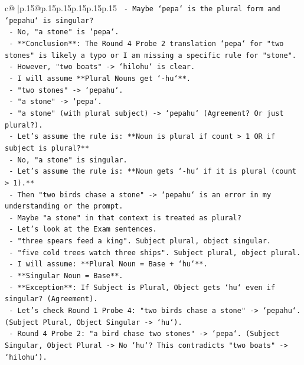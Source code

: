 \documentclass{article}
\begin{document}
{\begin{supertabular}{c@{$\;$}|p{.15\linewidth}@{}p{.15\linewidth}p{.15\linewidth}p{.15\linewidth}p{.15\linewidth}p{.15\linewidth}}
{{{\texttt{      {-} Maybe `pepa` is the plural form and `pepahu` is singular?} \\
\texttt{      {-} No, "a stone" is `pepa`.} \\
\texttt{      {-} **Conclusion**: The Round 4 Probe 2 translation `pepa` for "two stones" is likely a typo or I am missing a specific rule for "stone".} \\
\texttt{      {-} However, "two boats" {-}> `hilohu` is clear.} \\
\texttt{      {-} I will assume **Plural Nouns get `{-}hu`**.} \\
\texttt{      {-} "two stones" {-}> `pepahu`.} \\
\texttt{      {-} "a stone" {-}> `pepa`.} \\
\texttt{      {-} "a stone" (with plural subject) {-}> `pepahu` (Agreement? Or just plural?).} \\
\texttt{      {-} Let's assume the rule is: **Noun is plural if count > 1 OR if subject is plural?**} \\
\texttt{      {-} No, "a stone" is singular.} \\
\texttt{      {-} Let's assume the rule is: **Noun gets `{-}hu` if it is plural (count > 1).**} \\
\texttt{      {-} Then "two birds chase a stone" {-}> `pepahu` is an error in my understanding or the prompt.} \\
\texttt{      {-} Maybe "a stone" in that context is treated as plural?} \\
\texttt{      {-} Let's look at the Exam sentences.} \\
\texttt{      {-} "three spears feed a king". Subject plural, object singular.} \\
\texttt{      {-} "five cold trees watch three ships". Subject plural, object plural.} \\
\texttt{      {-} I will assume: **Plural Noun = Base + `hu`**.} \\
\texttt{      {-} **Singular Noun = Base**.} \\
\texttt{      {-} **Exception**: If Subject is Plural, Object gets `hu` even if singular? (Agreement).} \\
\texttt{      {-} Let's check Round 1 Probe 4: "two birds chase a stone" {-}> `pepahu`. (Subject Plural, Object Singular {-}> `hu`).} \\
\texttt{      {-} Round 4 Probe 2: "a bird chase two stones" {-}> `pepa`. (Subject Singular, Object Plural {-}> No `hu`? This contradicts "two boats" {-}> `hilohu`).} \\
}}}
\end{supertabular}}
\end{document}
